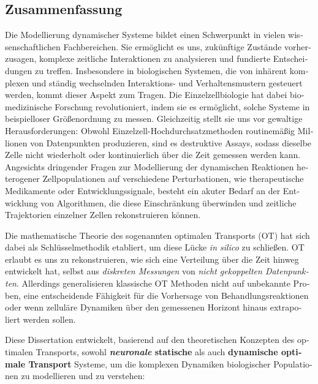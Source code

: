\begin{otherlanguage}{ngerman}
\chapter*{Zusammenfassung}

Die Modellierung dynamischer Systeme bildet einen Schwerpunkt in vielen wissenschaftlichen Fachbereichen. Sie erm{\"o}glicht es uns, zuk{\"u}nftige Zust{\"a}nde vorherzusagen, komplexe zeitliche Interaktionen zu analysieren und fundierte Entscheidungen zu treffen. Insbesondere in biologischen Systemen, die von inh{\"a}rent komplexen und st{\"a}ndig wechselnden Interaktions- und Verhaltensmustern gesteuert werden, kommt dieser Aspekt zum Tragen.
Die Einzelzellbiologie hat dabei biomedizinische Forschung revolutioniert, indem sie es erm{\"o}glicht, solche Systeme in beispielloser Gr{\"o}{\ss}enordnung zu messen. Gleichzeitig stellt sie uns vor gewaltige Herausforderungen: Obwohl Einzelzell-Hochdurchsatzmethoden routinem{\"a}{\ss}ig Millionen von Datenpunkten produzieren, sind es destruktive Assays, sodass dieselbe Zelle nicht wiederholt oder kontinuierlich {\"u}ber die Zeit gemessen werden kann.
Angesichts dringender Fragen zur Modellierung der dynamischen Reaktionen heterogener Zellpopulationen auf verschiedene Perturbationen, wie therapeutische Medikamente oder Entwicklungssignale, besteht ein akuter Bedarf an der Entwicklung von Algorithmen, die diese Einschr{\"a}nkung {\"u}berwinden und zeitliche Trajektorien einzelner Zellen rekonstruieren k{\"o}nnen.

Die mathematische Theorie des sogenannten optimalen Transports (OT) hat sich dabei als Schl{\"u}sselmethodik etabliert, um diese L{\"u}cke \emph{in silico} zu schlie{\ss}en. OT erlaubt es uns zu rekonstruieren, wie sich eine Verteilung {\"u}ber die Zeit hinweg entwickelt hat, selbst aus \textit{diskreten Messungen} von \textit{nicht gekoppelten Datenpunkten}. Allerdings generalisieren klassische OT Methoden nicht auf unbekannte Proben, eine entscheidende F{\"a}higkeit f{\"u}r die Vorhersage von Behandlungsreaktionen oder wenn zellul{\"a}re Dynamiken {\"u}ber den gemessenen Horizont hinaus extrapoliert werden sollen.

Diese Dissertation entwickelt, basierend auf den theoretischen Konzepten des optimalen Transports, sowohl \textbf{\textit{neuronale} statische} als auch \textbf{dynamische optimale Transport} Systeme, um die komplexen Dynamiken biologischer Populationen zu modellieren und zu verstehen:


\end{otherlanguage}
